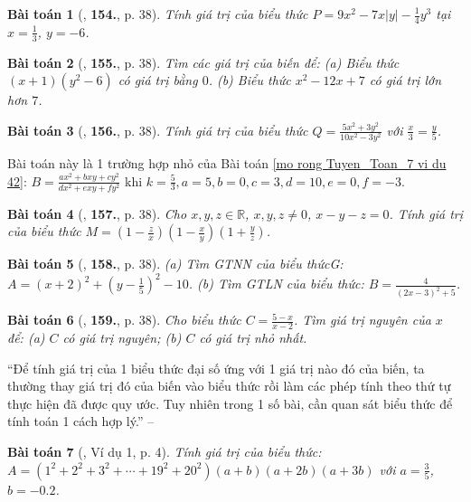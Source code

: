 \documentclass{article}
\numberwithin{equation}{section}
\newtheorem{baitoan}{Bài toán}
\begin{document}
\begin{baitoan}[\cite{Tuyen_Toan_7}, \textbf{154.}, p. 38]
	Tính giá trị của biểu thức $P = 9x^2 - 7x|y| - \frac{1}{4}y^3$ tại $x = \frac{1}{3}$, $y = -6$.
\end{baitoan}

\begin{baitoan}[\cite{Tuyen_Toan_7}, \textbf{155.}, p. 38]
	Tìm các giá trị của biến để: (a) Biểu thức $(x + 1)(y^2 - 6)$ có giá trị bằng $0$. (b) Biểu thức $x^2 - 12x + 7$ có giá trị lớn hơn $7$.
\end{baitoan}

\begin{baitoan}[\cite{Tuyen_Toan_7}, \textbf{156.}, p. 38]
	Tính giá trị của biểu thức $Q = \frac{5x^2 + 3y^2}{10x^2 - 3y^2}$ với $\frac{x}{3} = \frac{y}{5}$.
\end{baitoan}
Bài toán này là 1 trường hợp nhỏ của Bài toán \ref{mo rong Tuyen_Toan_7 vi du 42}: $B = \frac{ax^2 + bxy + cy^2}{dx^2 + exy + fy^2}$ khi $k = \frac{5}{3}, a = 5, b = 0, c = 3, d = 10, e = 0, f = -3$.

\begin{baitoan}[\cite{Tuyen_Toan_7}, \textbf{157.}, p. 38]
	Cho $x,y,z\in\mathbb{R}$, $x,y,z\ne0$, $x - y - z = 0$. Tính giá trị của biểu thức $M = \left(1 - \frac{z}{x}\right)\left(1 - \frac{x}{y}\right)\left(1 + \frac{y}{z}\right)$.
\end{baitoan}

\begin{baitoan}[\cite{Tuyen_Toan_7}, \textbf{158.}, p. 38]
	(a) Tìm GTNN của biểu thứcG: $A = (x + 2)^2 + \left(y - \frac{1}{5}\right)^2 - 10$. (b) Tìm GTLN của biểu thức: $B = \frac{4}{(2x - 3)^2 + 5}$.
\end{baitoan}

\begin{baitoan}[\cite{Tuyen_Toan_7}, \textbf{159.}, p. 38]
	Cho biểu thức $C = \frac{5 - x}{x - 2}$. Tìm giá trị nguyên của $x$ để: (a) $C$ có giá trị nguyên; (b) $C$ có giá trị nhỏ nhất.
\end{baitoan}
``Để tính giá trị của 1 biểu thức đại số ứng với 1 giá trị nào đó của biến, ta thường thay giá trị đó của biến vào biểu thức rồi làm các phép tính theo thứ tự thực hiện đã được quy ước. Tuy nhiên trong 1 số bài, cần quan sát biểu thức để tính toán 1 cách hợp lý.'' -- \cite[p. 4]{Binh_Toan_7_tap_2}

\begin{baitoan}[\cite{Binh_Toan_7_tap_2}, Ví dụ 1, p. 4]
	Tính giá trị của biểu thức: $A = (1^2 + 2^2 + 3^2 + \cdots + 19^2 + 20^2)(a + b)(a + 2b)(a + 3b)$ với $a = \frac{3}{5}$, $b = -0.2$.
\end{baitoan}
\end{document}
